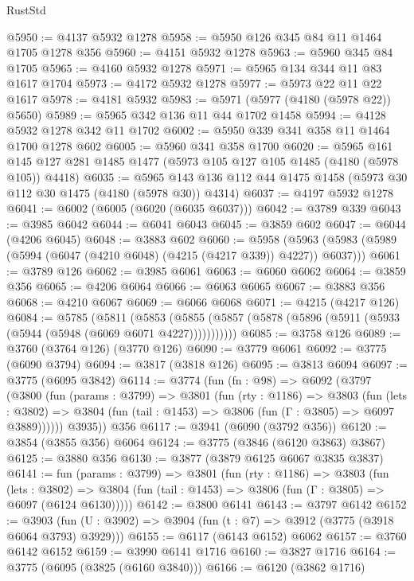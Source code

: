 \begin{lexlean}{RustStd}
\begin{coremodule}
@5950 := @4137 @5932 @1278
@5958 := @5950 @126 @345 @84 @11 @1464 @1705 @1278 @356
@5960 := @4151 @5932 @1278
@5963 := @5960 @345 @84 @1705
@5965 := @4160 @5932 @1278
@5971 := @5965 @134 @344 @11 @83 @1617 @1704
@5973 := @4172 @5932 @1278
@5977 := @5973 @22 @11 @22 @1617
@5978 := @4181 @5932
@5983 := @5971 (@5977 (@4180 (@5978 @22)) @5650)
@5989 := @5965 @342 @136 @11 @44 @1702 @1458
@5994 := @4128 @5932 @1278 @342 @11 @1702
@6002 := @5950 @339 @341 @358 @11 @1464 @1700 @1278 @602
@6005 := @5960 @341 @358 @1700
@6020 := @5965
    @161
    @145
    @127
    @281
    @1485
    @1477
    (@5973 @105 @127 @105 @1485 (@4180 (@5978 @105)) @4418)
@6035 := @5965 @143 @136 @112 @44 @1475 @1458 (@5973 @30 @112 @30 @1475 (@4180 (@5978 @30)) @4314)
@6037 := @4197 @5932 @1278
@6041 := @6002 (@6005 (@6020 (@6035 @6037)))
@6042 := @3789 @339
@6043 := @3985 @6042
@6044 := @6041 @6043
@6045 := @3859 @602
@6047 := @6044 (@4206 @6045)
@6048 := @3883 @602
@6060 := @5958
    (@5963 (@5983 (@5989 (@5994 (@6047 (@4210 @6048) (@4215 (@4217 @339)) @4227)) @6037)))
@6061 := @3789 @126
@6062 := @3985 @6061
@6063 := @6060 @6062
@6064 := @3859 @356
@6065 := @4206 @6064
@6066 := @6063 @6065
@6067 := @3883 @356
@6068 := @4210 @6067
@6069 := @6066 @6068
@6071 := @4215 (@4217 @126)
@6084 := @5785
    (@5811
      (@5853 (@5855 (@5857 (@5878 (@5896 (@5911 (@5933 (@5944 (@5948 (@6069 @6071 @4227)))))))))))
@6085 := @3758 @126
@6089 := @3760 (@3764 @126) (@3770 @126)
@6090 := @3779 @6061
@6092 := @3775 (@6090 @3794)
@6094 := @3817 (@3818 @126)
@6095 := @3813 @6094
@6097 := @3775 (@6095 @3842)
@6114 := @3774
    (fun (fn : @98) =>
    @6092
      (@3797
        (@3800
          (fun (params : @3799) =>
          @3801
            (fun (rty : @1186) =>
            @3803
              (fun (lets : @3802) =>
              @3804 (fun (tail : @1453) => @3806 (fun (Γ : @3805) => @6097 @3889))))))
        @3935))
    @356
@6117 := @3941 (@6090 (@3792 @356))
@6120 := @3854 (@3855 @356) @6064
@6124 := @3775 (@3846 (@6120 @3863) @3867)
@6125 := @3880 @356
@6130 := @3877 (@3879 @6125 @6067 @3835 @3837)
@6141 := fun (params : @3799) =>
  @3801
    (fun (rty : @1186) =>
    @3803
      (fun (lets : @3802) =>
      @3804 (fun (tail : @1453) => @3806 (fun (Γ : @3805) => @6097 (@6124 @6130)))))
@6142 := @3800 @6141
@6143 := @3797 @6142
@6152 := @3903 (fun (U : @3902) => @3904 (fun (t : @7) => @3912 (@3775 (@3918 @6064 @3793) @3929)))
@6155 := @6117 (@6143 @6152) @6062
@6157 := @3760 @6142 @6152
@6159 := @3990 @6141 @1716
@6160 := @3827 @1716
@6164 := @3775 (@6095 (@3825 (@6160 @3840)))
@6166 := @6120 (@3862 @1716)

\end{coremodule}
\end{lexlean}
